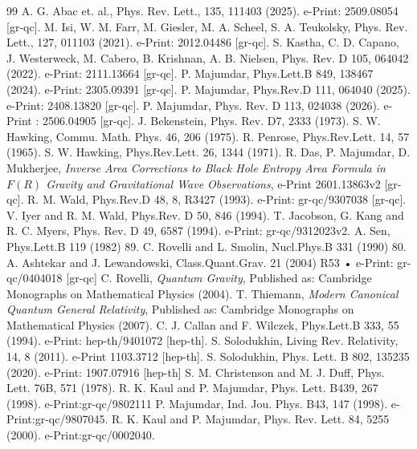 \documentclass[11pt]{article}
\begin{document}
{\begin{thebibliography}{99}
 A. G. Abac et. al., Phys. Rev. Lett., 135, 111403 (2025). e-Print: 2509.08054 [gr-qc].  
 M. Isi, W. M. Farr, M. Giesler, M. A. Scheel, S. A. Teukolsky, Phys. Rev. Lett., 127, 011103 (2021). e-Print: 2012.04486 [gr-qc].
 S. Kastha, C. D. Capano, J. Westerweck, M. Cabero, B. Krishnan, A. B. Nielsen, Phys. Rev. D 105, 064042 (2022). e-Print: 2111.13664 [gr-qc].
 P. Majumdar, Phys.Lett.B 849, 138467 (2024). e-Print: 2305.09391 [gr-qc].
 P. Majumdar, Phys.Rev.D 111, 064040 (2025). e-Print: 2408.13820 [gr-qc].
 P. Majumdar, Phys. Rev. D 113, 024038 (2026). e-Print : 2506.04905 [gr-qc].
 J. Bekenstein, Phys. Rev. D7, 2333 (1973).
 S. W. Hawking, Commu. Math. Phys. 46, 206 (1975).
 R. Penrose, Phys.Rev.Lett. 14, 57 (1965). 
 S. W. Hawking, Phys.Rev.Lett. 26, 1344 (1971).
 R. Das, P. Majumdar, D. Mukherjee, {\it Inverse Area Corrections to Black Hole Entropy Area Formula in $F(R)$ Gravity and Gravitational Wave Observations}, e-Print 2601.13863v2 [gr-qc].
 R. M. Wald, Phys.Rev.D 48, 8, R3427 (1993). e-Print: gr-qc/9307038 [gr-qc].
 V. Iyer and R. M. Wald, Phys.Rev. D 50, 846 (1994).
 T. Jacobson, G. Kang and R. C. Myers, Phys. Rev. D 49, 6587 (1994). e-Print: gr-qc/9312023v2. 
 A. Sen, Phys.Lett.B 119 (1982) 89.
 C. Rovelli and L. Smolin,  Nucl.Phys.B 331 (1990) 80.
 A. Ashtekar and J. Lewandowski, Class.Quant.Grav. 21 (2004) R53 • e-Print: gr-qc/0404018 [gr-qc]
 C. Rovelli, {\it Quantum Gravity}, Published as: Cambridge Monographs on Mathematical Physics (2004).
 T. Thiemann, {\it Modern Canonical Quantum General Relativity}, Published as: Cambridge Monographs on Mathematical Physics (2007). 
 C. J. Callan and F. Wilczek, Phys.Lett.B 333, 55 (1994). e-Print: hep-th/9401072 [hep-th].
 S. Solodukhin, Living Rev. Relativity, 14, 8 (2011). e-Print 1103.3712 [hep-th].  
 S. Solodukhin, Phys. Lett. B 802, 135235 (2020). e-Print: 1907.07916 [hep-th]
 S. M. Christenson and M. J. Duff, Phys. Lett. 76B, 571 (1978). 
 R. K. Kaul and P. Majumdar, Phys. Lett. B439, 267 (1998). e-Print:gr-qc/9802111
 P. Majumdar, Ind. Jou. Phys. B43, 147 (1998). e-Print:gr-qc/9807045.
 R. K. Kaul and P. Majumdar, Phys. Rev. Lett. 84, 5255 (2000). e-Print:gr-qc/0002040.

\end{thebibliography}}
\end{document}
